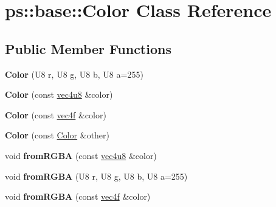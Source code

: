 \hypertarget{classps_1_1base_1_1Color}{}\section{ps\+:\+:base\+:\+:Color Class Reference}
\label{classps_1_1base_1_1Color}
\subsection*{Public Member Functions}
\begin{DoxyCompactItemize}
\item 
\hypertarget{classps_1_1base_1_1Color_a0d181ae7453c014306dc421269d3d75f}{}{\bfseries Color} (U8 r, U8 g, U8 b, U8 a=255)\label{classps_1_1base_1_1Color_a0d181ae7453c014306dc421269d3d75f}

\item 
\hypertarget{classps_1_1base_1_1Color_aefa2f23b75ddd1f6e53873171730af52}{}{\bfseries Color} (const \hyperlink{classps_1_1base_1_1Vec4}{vec4u8} \&color)\label{classps_1_1base_1_1Color_aefa2f23b75ddd1f6e53873171730af52}

\item 
\hypertarget{classps_1_1base_1_1Color_a673509a46c18076d6052cc29d77f609b}{}{\bfseries Color} (const \hyperlink{classps_1_1base_1_1Vec4}{vec4f} \&color)\label{classps_1_1base_1_1Color_a673509a46c18076d6052cc29d77f609b}

\item 
\hypertarget{classps_1_1base_1_1Color_a352197899c03e28afb23355cb51add8a}{}{\bfseries Color} (const \hyperlink{classps_1_1base_1_1Color}{Color} \&other)\label{classps_1_1base_1_1Color_a352197899c03e28afb23355cb51add8a}

\item 
\hypertarget{classps_1_1base_1_1Color_ab2448085505743432ce86e7f38a425b3}{}void {\bfseries from\+R\+G\+B\+A} (const \hyperlink{classps_1_1base_1_1Vec4}{vec4u8} \&color)\label{classps_1_1base_1_1Color_ab2448085505743432ce86e7f38a425b3}

\item 
\hypertarget{classps_1_1base_1_1Color_a6b1e941f99dcafaf9c17e8c489fea035}{}void {\bfseries from\+R\+G\+B\+A} (U8 r, U8 g, U8 b, U8 a=255)\label{classps_1_1base_1_1Color_a6b1e941f99dcafaf9c17e8c489fea035}

\item 
\hypertarget{classps_1_1base_1_1Color_a5eb4aec1126afc0f2d30136b99eeb9f4}{}void {\bfseries from\+R\+G\+B\+A} (const \hyperlink{classps_1_1base_1_1Vec4}{vec4f} \&color)\label{classps_1_1base_1_1Color_a5eb4aec1126afc0f2d30136b99eeb9f4}


\end{DoxyCompactItemize}
